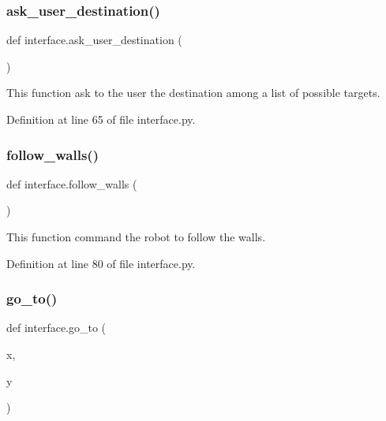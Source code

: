 \subsubsection{\texorpdfstring{ask\+\_\+user\+\_\+destination()}{ask\_user\_destination()}}
{\footnotesize\ttfamily def interface.\+ask\+\_\+user\+\_\+destination (\begin{DoxyParamCaption}{ }\end{DoxyParamCaption})}



This function ask to the user the destination among a list of possible targets. 



Definition at line 65 of file interface.\+py.

\mbox{\label{namespaceinterface_adb690fa0fc4d5c66808407e62379cfba}} 
\subsubsection{\texorpdfstring{follow\+\_\+walls()}{follow\_walls()}}
{\footnotesize\ttfamily def interface.\+follow\+\_\+walls (\begin{DoxyParamCaption}{ }\end{DoxyParamCaption})}



This function command the robot to follow the walls. 



Definition at line 80 of file interface.\+py.

\mbox{\label{namespaceinterface_a66f5ed4cd3345e5f1f4abe21259cf925}} 
\subsubsection{\texorpdfstring{go\+\_\+to()}{go\_to()}}
{\footnotesize\ttfamily def interface.\+go\+\_\+to (\begin{DoxyParamCaption}\item[{}]{x,  }\item[{}]{y }\end{DoxyParamCaption})}



